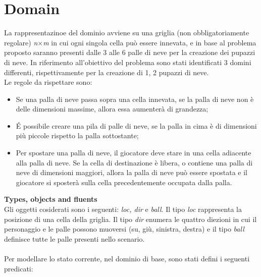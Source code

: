 \documentclass{article}
\begin{document}
\section*{Domain}
La rappresentazinoe del dominio avviene su una griglia (non obbligatoriamente regolare) \textit{n$\times$m} in cui ogni 
singola cella può essere innevata, e in base al problema proposto saranno presenti dalle 3 alle 6 palle di neve per la creazione
dei pupazzi di neve. In riferimento all'obiettivo del problema sono stati identificati 3 domini differenti, rispettivamente per la creazione 
di 1, 2 pupazzi di neve.\\ 
Le regole da rispettare sono:
\begin{itemize}
    \item Se una palla di neve passa sopra una cella innevata, se la palla di neve non è delle dimensioni massime, allora essa aumenterà di grandezza;
    \item É possibile creare una pila di palle di neve, se la palla in cima è di dimensioni più piccole rispetto la palla sottostante;
    \item Per spostare una palla di neve, il giocatore deve stare in una cella adiacente alla palla di neve. Se la cella di destinazione è libera, 
    o contiene una palla di neve di dimensioni maggiori, allora la palla di neve può essere spostata e il giocatore si sposterà sulla cella precedentemente 
    occupata dalla palla.
\end{itemize}
\textbf{Types, objects and fluents}\\
Gli oggetti cosiderati sono i seguenti: \textit{loc, dir} e \textit{ball}. Il tipo \textit{loc} rappresenta la posizione di una cella della griglia.
Il tipo \textit{dir} enumera le quattro diezioni in cui il personaggio e le palle possono muoversi (su, giù, sinistra, destra) e il tipo \textit{ball} definisce tutte le palle presenti nello scenario.
\\ \\
Per modellare lo stato corrente, nel dominio di base, sono stati defini i seguenti predicati:
\end{document}
